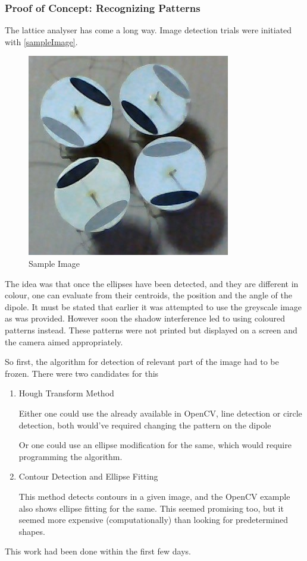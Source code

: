 		\subsubsection{Proof of Concept: Recognizing Patterns}
			The lattice analyser has come a long way. Image detection trials were initiated with \autoref{sampleImage}. 
			\begin{figure}[bth]
				\begin{center}
					\includegraphics[width=0.7\linewidth]{../../latticeAnalyser/picture002.jpg}
				\end{center}
			\caption[Sample Image]{Sample Image}
			\label{sampleImage}
			\end{figure}

			The idea was that once the ellipses have been detected, and they are different in colour, one can evaluate from their centroids, the position and the angle of the dipole. It must be stated that earlier it was attempted to use the greyscale image as was provided. However soon the shadow interference led to using coloured patterns instead. These patterns were not printed but displayed on a screen and the camera aimed appropriately.
			\par
			So first, the algorithm for detection of relevant part of the image had to be frozen. There were two candidates for this
			\begin{enumerate}
				\item Hough Transform Method
					\par
					Either one could use the already available in OpenCV, line detection or circle detection, both would've required changing the pattern on the dipole
					\par
					Or one could use an ellipse modification for the same, which would require programming the algorithm.
				\item Contour Detection and Ellipse Fitting
					\par
					This method detects contours in a given image, and the OpenCV example also shows ellipse fitting for the same. This seemed promising too, but it seemed more expensive (computationally) than looking for predetermined shapes.
			\end{enumerate}
			This work had been done within the first few days. 
			\par

